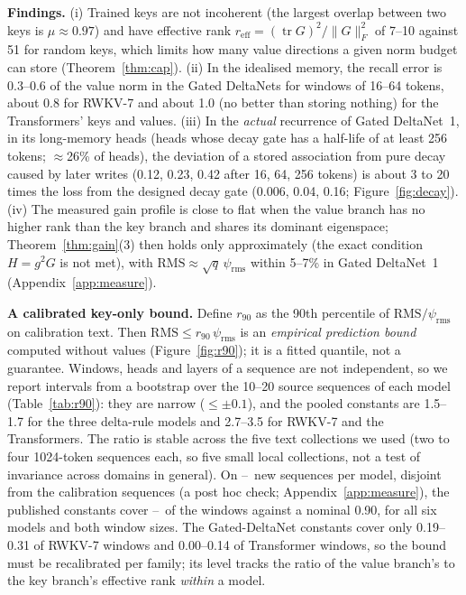 \documentclass{article}
\newcommand{\tr}{\operatorname{tr}}
\begin{document}
\textbf{Findings.} (i) Trained keys are not incoherent (the largest overlap between two keys is $\mu\approx0.97$) and have effective rank $r_{\mathrm{eff}}=(\tr G)^2/\|G\|_F^2$ of 7--10 against 51 for random keys, which limits how many value directions a given norm budget can store (Theorem~\ref{thm:cap}). (ii) In the idealised memory, the recall error is 0.3--0.6 of the value norm in the Gated DeltaNets for windows of 16--64 tokens, about 0.8 for RWKV-7 and about 1.0 (no better than storing nothing) for the Transformers' keys and values. (iii) In the \emph{actual} recurrence of Gated DeltaNet~1, in its long-memory heads (heads whose decay gate has a half-life of at least 256 tokens; $\approx$26\% of heads), the deviation of a stored association from pure decay caused by later writes (0.12, 0.23, 0.42 after 16, 64, 256 tokens) is about 3 to 20 times the loss from the designed decay gate (0.006, 0.04, 0.16; Figure~\ref{fig:decay}). (iv) The measured gain profile is close to flat when the value branch has no higher rank than the key branch and shares its dominant eigenspace; Theorem~\ref{thm:gain}(3) then holds only approximately (the exact condition $H=g^2G$ is not met), with $\mathrm{RMS}\approx\sqrt q\,\psi_{\mathrm{rms}}$ within 5--7\% in Gated DeltaNet~1 (Appendix~\ref{app:measure}).

\textbf{A calibrated key-only bound.} Define $r_{90}$ as the 90th percentile of $\mathrm{RMS}/\psi_{\mathrm{rms}}$ on calibration text. Then $\mathrm{RMS}\le r_{90}\,\psi_{\mathrm{rms}}$ is an \emph{empirical prediction bound} computed without values (Figure~\ref{fig:r90}); it is a fitted quantile, not a guarantee. Windows, heads and layers of a sequence are not independent, so we report intervals from a bootstrap over the 10--20 source sequences of each model (Table~\ref{tab:r90}): they are narrow ($\le\pm0.1$), and the pooled constants are 1.5--1.7 for the three delta-rule models and 2.7--3.5 for RWKV-7 and the Transformers. The ratio is stable across the five text collections we used (two to four 1024-token sequences each, so five small local collections, not a test of invariance across domains in general). On \heldSeqLo--\heldSeqHi\ new sequences per model, disjoint from the calibration sequences (a post hoc check; Appendix~\ref{app:measure}), the published constants cover \heldCovLo--\heldCovHi\ of the windows against a nominal 0.90, for all six models and both window sizes. The Gated-DeltaNet constants cover only 0.19--0.31 of RWKV-7 windows and 0.00--0.14 of Transformer windows, so the bound must be recalibrated per family; its level tracks the ratio of the value branch's to the key branch's effective rank \emph{within} a model.
\end{document}
